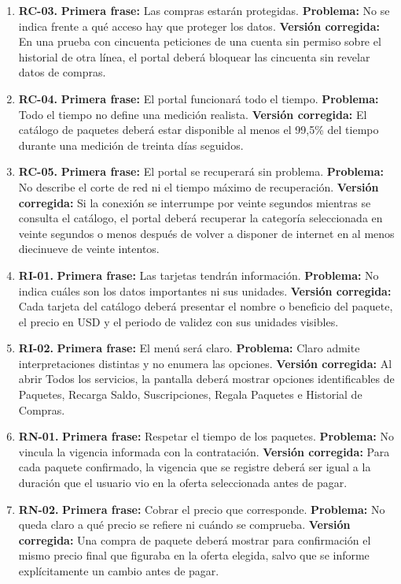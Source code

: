 \documentclass[12pt,a4paper]{article}
\begin{document}
\begin{enumerate}[leftmargin=*,itemsep=7pt]
\item \textbf{RC-03.} \textbf{Primera frase:} Las compras estarán protegidas. \textbf{Problema:} No se indica frente a qué acceso hay que proteger los datos. \textbf{Versión corregida:} En una prueba con cincuenta peticiones de una cuenta sin permiso sobre el historial de otra línea, el portal deberá bloquear las cincuenta sin revelar datos de compras.

\item \textbf{RC-04.} \textbf{Primera frase:} El portal funcionará todo el tiempo. \textbf{Problema:} Todo el tiempo no define una medición realista. \textbf{Versión corregida:} El catálogo de paquetes deberá estar disponible al menos el 99,5\% del tiempo durante una medición de treinta días seguidos.

\item \textbf{RC-05.} \textbf{Primera frase:} El portal se recuperará sin problema. \textbf{Problema:} No describe el corte de red ni el tiempo máximo de recuperación. \textbf{Versión corregida:} Si la conexión se interrumpe por veinte segundos mientras se consulta el catálogo, el portal deberá recuperar la categoría seleccionada en veinte segundos o menos después de volver a disponer de internet en al menos diecinueve de veinte intentos.

\item \textbf{RI-01.} \textbf{Primera frase:} Las tarjetas tendrán información. \textbf{Problema:} No indica cuáles son los datos importantes ni sus unidades. \textbf{Versión corregida:} Cada tarjeta del catálogo deberá presentar el nombre o beneficio del paquete, el precio en USD y el periodo de validez con sus unidades visibles.

\item \textbf{RI-02.} \textbf{Primera frase:} El menú será claro. \textbf{Problema:} Claro admite interpretaciones distintas y no enumera las opciones. \textbf{Versión corregida:} Al abrir Todos los servicios, la pantalla deberá mostrar opciones identificables de Paquetes, Recarga Saldo, Suscripciones, Regala Paquetes e Historial de Compras.

\item \textbf{RN-01.} \textbf{Primera frase:} Respetar el tiempo de los paquetes. \textbf{Problema:} No vincula la vigencia informada con la contratación. \textbf{Versión corregida:} Para cada paquete confirmado, la vigencia que se registre deberá ser igual a la duración que el usuario vio en la oferta seleccionada antes de pagar.

\item \textbf{RN-02.} \textbf{Primera frase:} Cobrar el precio que corresponde. \textbf{Problema:} No queda claro a qué precio se refiere ni cuándo se comprueba. \textbf{Versión corregida:} Una compra de paquete deberá mostrar para confirmación el mismo precio final que figuraba en la oferta elegida, salvo que se informe explícitamente un cambio antes de pagar.


\end{enumerate}
\end{document}
